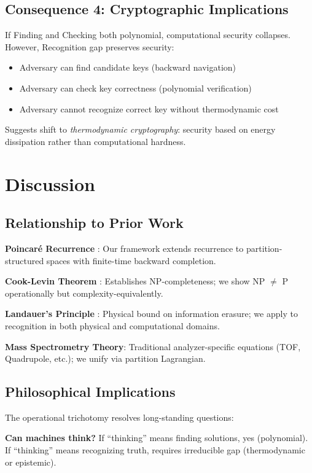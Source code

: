 \documentclass[twocolumn,aps,prl,superscriptaddress,floatfix]{revtex4-2}
\begin{document}
\subsection{Consequence 4: Cryptographic Implications}

If Finding and Checking both polynomial, computational security collapses. However, Recognition gap preserves security:
\begin{itemize}
\item Adversary can find candidate keys (backward navigation)
\item Adversary can check key correctness (polynomial verification)
\item Adversary cannot recognize correct key without thermodynamic cost
\end{itemize}

Suggests shift to \emph{thermodynamic cryptography}: security based on energy dissipation rather than computational hardness.

\section{Discussion}

\subsection{Relationship to Prior Work}

\textbf{Poincar\'e Recurrence} \cite{Poincare1890}: Our framework extends recurrence to partition-structured spaces with finite-time backward completion.

\textbf{Cook-Levin Theorem} \cite{Cook1971,Levin1973}: Establishes NP-completeness; we show NP $\neq$ P operationally but complexity-equivalently.

\textbf{Landauer's Principle} \cite{Landauer1961}: Physical bound on information erasure; we apply to recognition in both physical and computational domains.

\textbf{Mass Spectrometry Theory}: Traditional analyzer-specific equations (TOF, Quadrupole, etc.); we unify via partition Lagrangian.

\subsection{Philosophical Implications}

The operational trichotomy resolves long-standing questions:

\textbf{Can machines think?} If ``thinking'' means finding solutions, yes (polynomial). If ``thinking'' means recognizing truth, requires irreducible gap (thermodynamic or epistemic).
\end{document}
